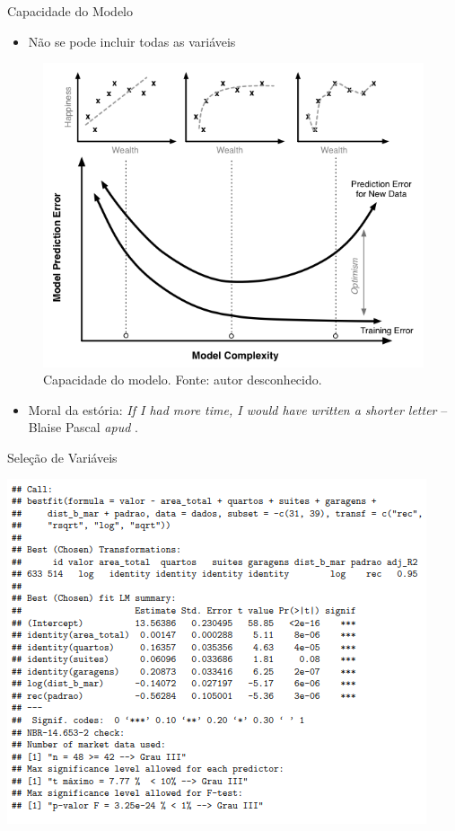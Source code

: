 \documentclass[9pt,ignorenonframetext,aspectratio=169]{beamer}
\providecommand{\tightlist}{%
  \setlength{\itemsep}{0pt}\setlength{\parskip}{0pt}}
\begin{document}
\begin{frame}{Capacidade do Modelo}
\protect\hypertarget{capacidade-do-modelo}{}

\begin{itemize}[<+->]
\tightlist
\item
  Não se pode incluir todas as variáveis
\end{itemize}

\begin{figure}

{\centering \includegraphics[width=0.4\linewidth]{../../images/model_complexity} 

}

\caption{Capacidade do modelo. Fonte: autor desconhecido.}\label{fig:unnamed-chunk-4}
\end{figure}

\begin{itemize}[<+->]
\tightlist
\item
  Moral da estória:
  \emph{If I had more time, I would have written a shorter
  letter} -- Blaise Pascal \emph{apud} \textcite{matloff2017}.
\end{itemize}

\end{frame}

\begin{frame}{Seleção de Variáveis}
\protect\hypertarget{seleuxe7uxe3o-de-variuxe1veis}{}

\begin{center}\includegraphics[width=0.7\linewidth]{../../images/modelo} \end{center}

\end{frame}
\end{document}
